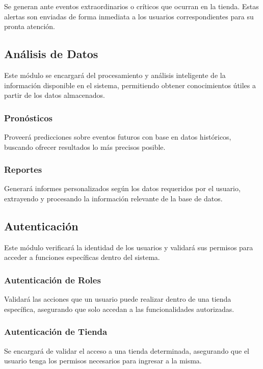 Se generan ante eventos extraordinarios o críticos que ocurran en la tienda. Estas alertas son enviadas de forma 
inmediata a los usuarios correspondientes para su pronta atención.

\subsection{Análisis de Datos}

Este módulo se encargará del procesamiento y análisis inteligente de la información disponible en el sistema, permitiendo 
obtener conocimientos útiles a partir de los datos almacenados.

\subsubsection{Pronósticos}

Proveerá predicciones sobre eventos futuros con base en datos históricos, buscando ofrecer resultados 
lo más precisos posible.

\subsubsection{Reportes}

Generará informes personalizados según los datos requeridos por el usuario, extrayendo y procesando la 
información relevante de la base de datos.

\subsection{Autenticación}

Este módulo verificará la identidad de los usuarios y validará sus permisos para acceder a funciones 
específicas dentro del sistema.

\subsubsection{Autenticación de Roles}

Validará las acciones que un usuario puede realizar dentro de una tienda específica, asegurando 
que solo accedan a las funcionalidades autorizadas.

\subsubsection{Autenticación de Tienda}

Se encargará de validar el acceso a una tienda determinada, asegurando que el usuario tenga los permisos 
necesarios para ingresar a la misma.
